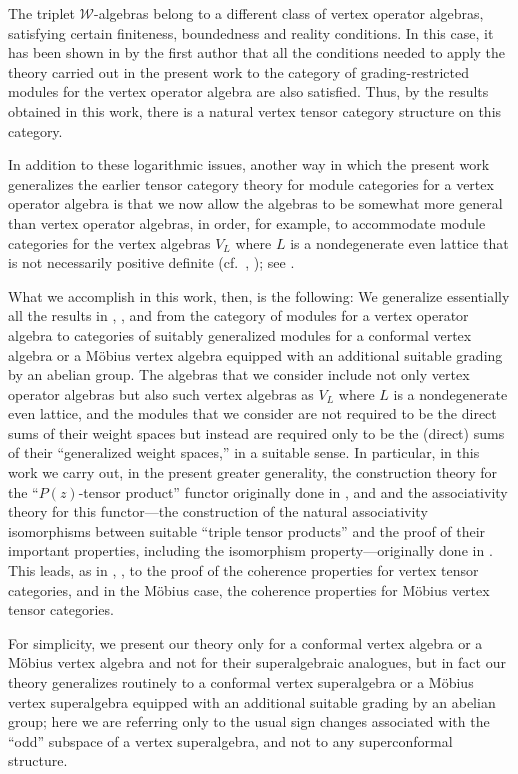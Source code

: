 \documentclass[12pt]{article}
\begin{document}
The triplet $\mathcal{W}$-algebras belong to a different class of
vertex operator algebras, satisfying certain finiteness, boundedness
and reality conditions.  In this case, it has been shown in \cite{H13}
by the first author that all the conditions needed to apply the theory
carried out in the present work to the category of grading-restricted
modules for the vertex operator algebra are also satisfied.  Thus, by
the results obtained in this work, there is a natural vertex tensor
category structure on this category.

In addition to these logarithmic issues, another way in which the
present work generalizes the earlier tensor category theory for module
categories for a vertex operator algebra is that we now allow the
algebras to be somewhat more general than vertex operator algebras, in
order, for example, to accommodate module categories for the vertex
algebras $V_L$ where $L$ is a nondegenerate even lattice that is not
necessarily positive definite (cf.\ \cite{B}, \cite{DL}); see
\cite{Z1}.

What we accomplish in this work, then, is the following: We generalize
essentially all the results in \cite{tensor1}, \cite{tensor2},
\cite{tensor3} and \cite{tensor4} {}from the category of modules for a
vertex operator algebra to categories of suitably generalized modules
for a conformal vertex algebra or a M\"obius vertex algebra equipped
with an additional suitable grading by an abelian group.  The algebras
that we consider include not only vertex operator algebras but also
such vertex algebras as $V_L$ where $L$ is a nondegenerate even
lattice, and the modules that we consider are not required to be the
direct sums of their weight spaces but instead are required only to be
the (direct) sums of their ``generalized weight spaces,'' in a
suitable sense.  In particular, in this work we carry out, in the
present greater generality, the construction theory for the
``$P(z)$-tensor product'' functor originally done in \cite{tensor1},
\cite{tensor2} and \cite{tensor3} and the associativity theory for
this functor---the construction of the natural associativity
isomorphisms between suitable ``triple tensor products'' and the proof
of their important properties, including the isomorphism
property---originally done in \cite{tensor4}. This leads, as in
\cite{tensorK}, \cite{tensor5}, to the proof of the coherence
properties for vertex tensor categories, and in the M\"obius case, the
coherence properties for M\"obius vertex tensor categories.

For simplicity, we present our theory only for a conformal vertex
algebra or a M\"obius vertex algebra and not for their superalgebraic
analogues, but in fact our theory generalizes routinely to a conformal
vertex superalgebra or a M\"obius vertex superalgebra equipped with an
additional suitable grading by an abelian group; here we are referring
only to the usual sign changes associated with the ``odd'' subspace of
a vertex superalgebra, and not to any superconformal structure.
\end{document}
